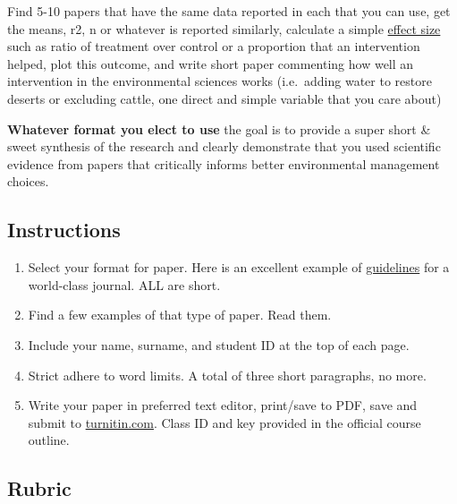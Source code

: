 \documentclass[
]{book}
\begin{document}
Find 5-10 papers that have the same data reported in each that you can use, get the means, r2, n or whatever is reported similarly, calculate a simple \href{https://en.wikipedia.org/wiki/Effect_size}{effect size} such as ratio of treatment over control or a proportion that an intervention helped, plot this outcome, and write short paper commenting how well an intervention in the environmental sciences works (i.e.~adding water to restore deserts or excluding cattle, one direct and simple variable that you care about)

\textbf{Whatever format you elect to use} the goal is to provide a super short \& sweet synthesis of the research and clearly demonstrate that you used scientific evidence from papers that critically informs better environmental management choices.

\hypertarget{instructions-3}{%
\subsection*{Instructions}\label{instructions-3}}

\begin{enumerate}
\def\labelenumi{\arabic{enumi}.}
\item
  Select your format for paper. Here is an excellent example of \href{https://www.oikosjournal.org/authors/author-guidelines}{guidelines} for a world-class journal. ALL are short.
\item
  Find a few examples of that type of paper. Read them.
\item
  Include your name, surname, and student ID at the top of each page.
\item
  Strict adhere to word limits. A total of three short paragraphs, no more.
\item
  Write your paper in preferred text editor, print/save to PDF, save and submit to \href{https://www.turnitin.com}{turnitin.com}. Class ID and key provided in the official course outline.
\end{enumerate}

\hypertarget{rubric-2}{%
\subsection*{Rubric}\label{rubric-2}}
\end{document}
